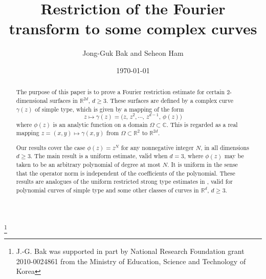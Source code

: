 \documentclass[11 pt]{amsart}
\theoremstyle{plain}
\numberwithin{equation}{section}
\theoremstyle{plain}
\numberwithin{equation}{section}
\theoremstyle{remark}
\begin{document}
\date{\today}

\title
[Restriction estimate for complex curves] {Restriction of the Fourier
transform to some complex curves}

\author[]
{Jong-Guk Bak  and  Seheon Ham}

\address {Department of Mathematics\\ Pohang University of Science and Technology
\\ Pohang 790-784, Korea} 

 

\thanks{
J.-G. Bak was supported in part by National Research Foundation grant 2010-0024861
from the Ministry of Education, Science and Technology of Korea}

\begin{abstract}
The purpose of this paper is to prove a Fourier restriction estimate for certain 2-dimensional
surfaces in ${{\mathbb {R}}}^{2d}$, $d\ge 3$. These surfaces are defined by a complex curve $\gamma(z)$ of simple type, which is given by a mapping of the form
\[ z\mapsto \gamma (z) = \Big(z, \, z^2,\cdots, \, z^{d-1}, \, \phi(z) \Big) \]
where $\phi(z)$ is an analytic function on a domain $\Omega \subset {{\mathbb {C}}}$. This is regarded as a real mapping $z=(x,y) \mapsto \gamma(x,y)$ from $\Omega \subset {{\mathbb {R}}}^2$ to ${{\mathbb {R}}}^{2d}$.

Our results cover the case $\phi(z) = z^N$ for any nonnegative integer $N$, in all dimensions $d\ge 3$. The main result is a uniform estimate, valid when $d=3$, where $\phi(z)$ may be taken to be an arbitrary polynomial of degree at most $N$. It is uniform in the sense that the operator norm is independent of the coefficients of the polynomial. These results are analogues of the uniform restricted strong type estimates in \cite{BOS3}, valid for polynomial curves of simple type and some other classes of curves in ${{\mathbb {R}}}^d$, $d\ge 3$.
\end{abstract}

\maketitle
\end{document}
